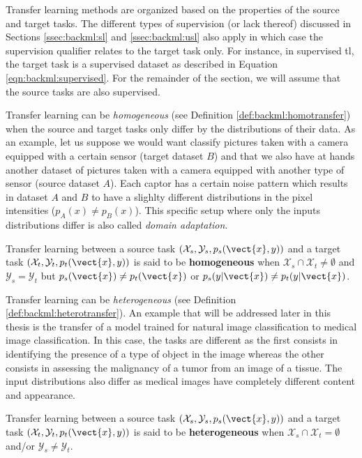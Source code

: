 Transfer learning methods are organized based on the properties of the source and target tasks. The different types of supervision (or lack thereof) discussed in Sections \ref{ssec:backml:sl} and \ref{ssec:backml:usl} also apply in which case the supervision qualifier relates to the target task only. For instance, in supervised \acrlong{tl}, the target task is a supervised dataset as described in Equation \ref{eqn:backml:supervised}. For the remainder of the section, we will assume that the source tasks are also supervised. 

Transfer learning can be \textit{homogeneous} (see Definition \ref{def:backml:homotransfer}) when the source and target tasks only differ by the distributions of their data. As an example, let us suppose we would want classify pictures taken with a camera equipped with a certain sensor (target dataset $B$) and that we also have at hands another dataset of pictures taken with a camera equipped with another type of sensor (source dataset $A$). Each captor has a certain noise pattern which results in dataset $A$ and $B$ to have a slighlty different distributions in the pixel intensities (\ie $p_A(x) \neq p_B(x)$). This specific setup where only the inputs distributions differ is also called \textit{domain adaptation}.  

\begin{definition}
\label{def:backml:homotransfer}
Transfer learning between a source task $\left(\mathcal{X}_{s}, \mathcal{Y}_{s}, p_{s}(\vect{x}, y)\right)$ and a target task $\left(\mathcal{X}_t, \mathcal{Y}_t, p_t(\vect{x}, y)\right)$ is said to be \textbf{homogeneous} when $\mathcal{X}_s \cap \mathcal{X}_t \neq \emptyset$ and $\mathcal{Y}_s = \mathcal{Y}_t$ but $p_s(\vect{x}) \neq p_t(\vect{x})$ or $p_s(y|\vect{x}) \neq p_t(y|\vect{x})$. 
\end{definition}

Transfer learning can be \textit{heterogeneous} (see Definition \ref{def:backml:heterotransfer}). An example that will be addressed later in this thesis is the transfer of a model trained for natural image classification to medical image classification. In this case, the tasks are different as the first consists in identifying the presence of a type of object in the image whereas the other consists in assessing the malignancy of a tumor from an image of a tissue. The input distributions also differ as medical images have completely different content and appearance.  

\begin{definition}
\label{def:backml:heterotransfer}
Transfer learning between a source task $\left(\mathcal{X}_{s}, \mathcal{Y}_{s}, p_{s}(\vect{x}, y)\right)$ and a target task $\left(\mathcal{X}_t, \mathcal{Y}_t, p_t(\vect{x}, y)\right)$ is said to be \textbf{heterogeneous} when $\mathcal{X}_s \cap \mathcal{X}_t = \emptyset$ and/or $\mathcal{Y}_s \neq \mathcal{Y}_t$.
\end{definition}

